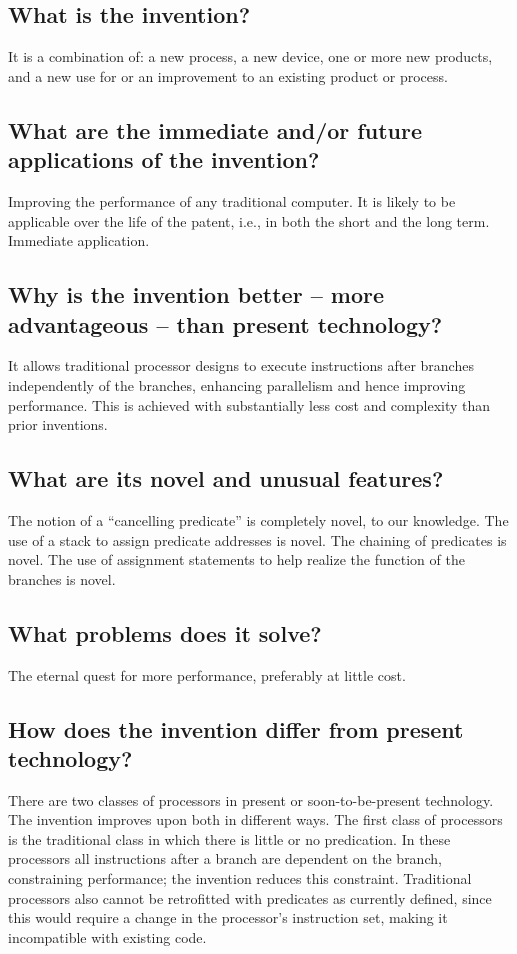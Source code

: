 \documentclass[10pt,dvips]{article}
\begin{document}
\subsection{What is the invention?}
It is a combination of: a new process, a new device, one or more new
products, and a new use for or
an improvement to an existing product or process.

\subsection{What are the immediate and/or future applications of the invention?}
Improving the performance of any traditional computer.
It is likely to be applicable over the
life of the patent, i.e., in both the short and the long term. Immediate application.

\subsection{Why is the invention better -- more advantageous -- than present technology?}
It allows traditional processor designs to execute instructions after branches
independently of the branches, enhancing parallelism and hence improving performance.
This is achieved with substantially less cost and complexity than prior inventions.

\subsection{What are its novel and unusual features?}
The notion of a ``cancelling predicate'' is completely novel, to our knowledge.
The use of a stack to assign predicate addresses is novel. The chaining of
predicates is novel. The use of assignment statements to help realize the function
of the branches is novel.

\subsection{What problems does it solve?}
The eternal quest for more performance, preferably at little cost.

\subsection{How does the invention differ from present technology?}
There are two classes of processors in present or soon-to-be-present technology.
The invention improves upon both in different ways. The first class of processors
is the traditional class in which there is little or no predication. In these
processors all instructions after a branch are dependent on the branch, constraining
performance; the invention reduces this constraint. Traditional processors also
cannot be retrofitted with predicates as currently defined, since this would
require a change in the processor's instruction set, making it incompatible with
existing code.
\end{document}

